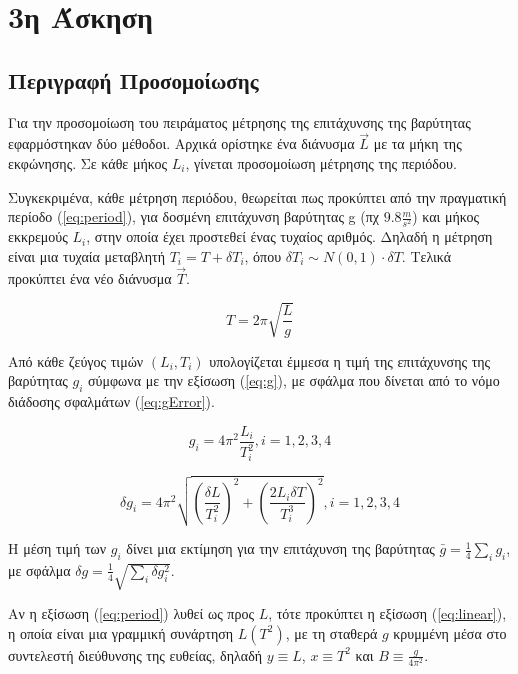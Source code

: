 \documentclass[assignment1.tex]{subfiles}
\begin{document}
\section*{3η Άσκηση}


\subsection*{Περιγραφή Προσομοίωσης}
Για την προσομοίωση του πειράματος μέτρησης της επιτάχυνσης της βαρύτητας εφαρμόστηκαν δύο μέθοδοι. Αρχικά ορίστηκε ένα διάνυσμα $\vec{L}$ με τα μήκη της εκφώνησης. Σε κάθε μήκος $L_i$, γίνεται προσομοίωση μέτρησης της περιόδου. 

Συγκεκριμένα, κάθε μέτρηση περιόδου, θεωρείται πως προκύπτει από την πραγματική περίοδο (\ref{eq:period}), για δοσμένη επιτάχυνση βαρύτητας \textlatin{g} (πχ $9.8\frac{m}{s^2}$) και μήκος εκκρεμούς $L_i$, στην οποία έχει προστεθεί ένας τυχαίος αριθμός. Δηλαδή η μέτρηση είναι μια τυχαία μεταβλητή $T_i = T + \delta T_i$, όπου $\delta T_i \sim N(0,1)\cdot \delta T$. Τελικά προκύπτει ένα νέο διάνυσμα $\vec{T}$.

\begin{equation}
T = 2\pi \sqrt{\frac{L}{g}}
\label{eq:period}
\end{equation}

Από κάθε ζεύγος τιμών $(L_i, T_i)$ υπολογίζεται έμμεσα η τιμή της επιτάχυνσης της βαρύτητας $g_i$ σύμφωνα με την εξίσωση (\ref{eq:g}), με σφάλμα που δίνεται από το νόμο διάδοσης σφαλμάτων (\ref{eq:gError}).

\begin{equation}
g_i = 4\pi^2 \frac{L_i}{T_i^2}, i=1,2,3,4
\label{eq:g}
\end{equation}

\begin{equation}
\delta g_i = 4\pi^2 \sqrt{\left(\frac{\delta L}{T_i^2}\right)^2 + \left(\frac{2L_i\delta T}{T_i^3}\right)^2}, i=1,2,3,4
\label{eq:gError}
\end{equation}

Η μέση τιμή των $g_i$ δίνει μια εκτίμηση για την επιτάχυνση της βαρύτητας $\bar{g}=\frac{1}{4}\sum_i g_i$, με σφάλμα $\delta g = \frac{1}{4}\sqrt{\sum_i \delta g_i^2}$.

Αν η εξίσωση (\ref{eq:period}) λυθεί ως προς $L$, τότε προκύπτει η εξίσωση (\ref{eq:linear}), η οποία είναι μια γραμμική συνάρτηση $L(T^2)$, με τη σταθερά $g$ κρυμμένη μέσα στο συντελεστή διεύθυνσης της ευθείας, δηλαδή $y\equiv L$, $x \equiv T^2$ και $B\equiv  \frac{g}{4\pi ^2}$.
\end{document}
